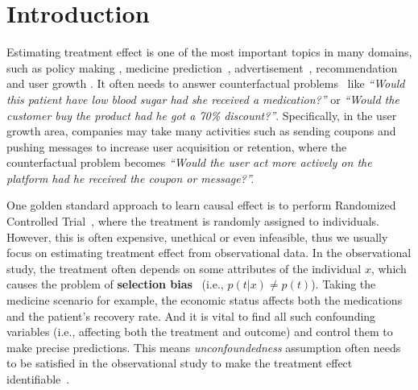 \documentclass[sigconf]{acmart}
\begin{document}
\section{Introduction}
Estimating treatment effect is one of the most important topics in many domains, such as policy making \cite{lalonde1986evaluating,Athey2016RecursivePF}, medicine prediction~\citep{Shalit2017EstimatingIT}, advertisement~\citep{Bottou2013CounterfactualRA,Sun2015CausalIV,gu2021estimating}, recommendation \citep{zhang2021causal,wang2021counterfactual} and user growth \cite{du2019improve}. It often needs to answer counterfactual problems~\citep{pearl2009causality} like \textit{“Would this patient have low blood sugar had she received a medication?”} or \textit{“Would the customer buy the product had he got a 70\% discount?”}. 
Specifically, in the user growth area, companies may take many activities such as sending coupons and pushing messages to increase user acquisition or retention, where the counterfactual problem becomes
\textit{“Would the user act more actively on the platform had he received the coupon or message?”.}\par
One golden standard approach to learn causal effect is to perform Randomized Controlled Trial~\citep{pearl2009causality}, where the treatment is randomly assigned to individuals. However, this is often expensive, unethical or even infeasible, thus we usually focus on estimating treatment effect from observational data. In the observational study, the treatment often depends on some attributes of the individual $x$, which causes the problem of \textbf{selection bias}~\citep{Imbens2015CausalIF} (i.e., $p(t|x)\neq p(t)$). Taking the medicine scenario for example, the economic status affects both the medications and the patient's recovery rate. And it is vital to find all such confounding variables (i.e., affecting both the treatment and outcome) and control them to make precise predictions. This means \textit{unconfoundedness} assumption often needs to be satisfied in the observational study to make the treatment effect identifiable~\citep{pearl2009causality}.\par
\end{document}
